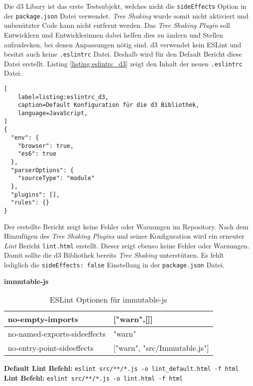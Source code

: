 Die d3 Libary ist das erste Testsubjekt, welches nicht die \lstinline{sideEffects} Option in der \lstinline{package.json} Datei verwendet. \textit{Tree Shaking} wurde somit nicht aktiviert und unbenützter Code kann nicht entfernt werden. Das \textit{Tree Shaking Plugin} soll Entwicklern und Entwicklerinnen dabei helfen dies zu ändern und Stellen aufzudecken, bei denen Anpassungen nötig sind. d3 verwendet kein ESLint und besitzt auch keine \lstinline{.eslintrc} Datei. Deshalb wird für den Default Bericht diese Datei erstellt. Listing \ref{listing:eslintrc_d3} zeigt den Inhalt der neuen \lstinline{.eslintrc} Datei.

\begin{lstlisting}[
    label=listing:eslintrc_d3,
	caption=Default Konfiguration für die d3 Bibliothek,
	language=JavaScript,
]
{
  "env": {
    "browser": true,
    "es6": true
  },
  "parserOptions": {
    "sourceType": "module"
  },
  "plugins": [],
  "rules": {}
}
\end{lstlisting}

Der erstellte Bericht zeigt keine Fehler oder Warnungen im Repository. Nach dem Hinzufügen des \textit{Tree Shaking Plugins} und seiner Konfiguration wird ein erneuter \textit{Lint} Bericht \lstinline{lint.html} erstellt. Dieser zeigt ebenso keine Fehler oder Warnungen. Damit sollte die d3 Bibliothek bereits \textit{Tree Shaking} unterstützen. Es fehlt lediglich die \lstinline{sideEffects: false} Einstellung in der \lstinline{package.json} Datei.

\textbf{immutable-js}
\begin{table}[H]
\centering
\caption{ESLint Optionen für immutable-js}
\label{tbl:immutable-options}
\begin{tabular}{|l|l|}
\hline
no-empty-imports             & {[}"warn",{[}{]}{]}         \\ \hline
no-named-exports-sideeffects & "warn"                      \\ \hline
no-entry-point-sideeffects   & {[}"warn", "src/Immutable.js"{]} \\ \hline
\end{tabular}
\end{table}

\begin{center}
\textbf{Default Lint Befehl:} \lstinline{eslint src/**/*.js -o lint_default.html -f html}\linebreak 
\textbf{Lint Befehl:} \lstinline{eslint src/**/*.js -o lint.html -f html}
\end{center}


